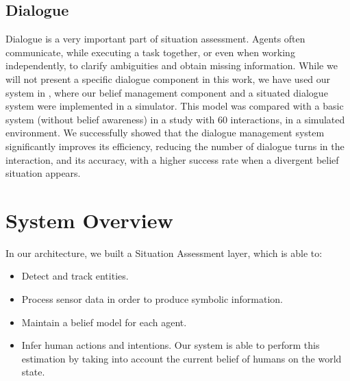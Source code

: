 \subsection{Dialogue}
Dialogue is a very important part of situation assessment. Agents often communicate, while executing a task together, or even when working independently, to clarify ambiguities and obtain missing information. While we will not present a specific dialogue component in this work, we have used our system in \cite{Ferreira2015}, where our belief management component and a situated dialogue system were implemented in a simulator. This model was compared with a basic system (without belief awareness) in a study with 60 interactions, in a simulated environment. We successfully showed that the dialogue management system significantly improves its efficiency, reducing the number of dialogue turns in the interaction, and its accuracy, with a higher success rate when a divergent belief situation appears.

\section{System Overview}
\label{sec:situation_assessment-overview}

In our architecture, we built a Situation Assessment layer, which is able to:
\begin{itemize}
\item  Detect and track entities.
\item  Process sensor data in order to produce symbolic information.
\item  Maintain a belief model for each agent.
\item  Infer human actions and intentions. Our system is able to perform this estimation by taking into account the current belief of humans on the world state. 
\end{itemize} 

